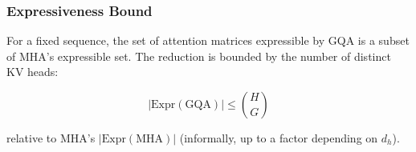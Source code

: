 \subsubsection{Expressiveness Bound}

For a fixed sequence, the set of attention matrices expressible by GQA is a 
subset of MHA's expressible set. The reduction is bounded by the number of 
distinct KV heads:

\[
|\text{Expr}(\text{GQA})| \le \binom{H}{G}
\tag{4.8}
\]

relative to MHA's $|\text{Expr}(\text{MHA})|$ (informally, up to a 
factor depending on $d_h$).